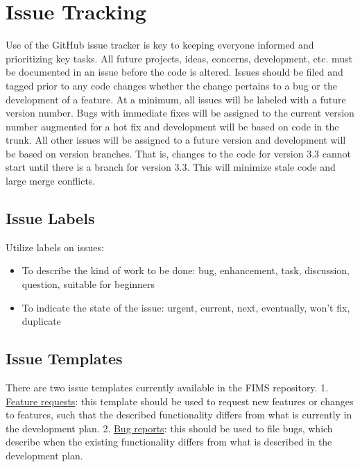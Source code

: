 \documentclass[
]{book}
\providecommand{\tightlist}{%
  \setlength{\itemsep}{0pt}\setlength{\parskip}{0pt}}
\begin{document}
\hypertarget{issue-tracking}{%
\chapter{Issue Tracking}\label{issue-tracking}}

Use of the GitHub issue tracker is key to keeping everyone informed and prioritizing key tasks. All future projects, ideas, concerns, development,
etc. must be documented in an issue before the code is altered. Issues should be filed and tagged prior to any code changes whether the change
pertains to a bug or the development of a feature. At a minimum, all issues will be labeled with a future version number. Bugs with immediate fixes will
be assigned to the current version number augmented for a hot fix and development will be based on code in the trunk. All other issues will be
assigned to a future version and development will be based on version branches. That is, changes to the code for version 3.3 cannot start until there is a branch
for version 3.3. This will minimize stale code and large merge conflicts.

\hypertarget{issue-labels}{%
\section{Issue Labels}\label{issue-labels}}

Utilize labels on issues:

\begin{itemize}
\tightlist
\item
  To describe the kind of work to be done: bug, enhancement, task, discussion, question, suitable for beginners
\item
  To indicate the state of the issue: urgent, current, next, eventually, won't fix, duplicate
\end{itemize}

\hypertarget{issue-templates}{%
\section{Issue Templates}\label{issue-templates}}

There are two issue templates currently available in the FIMS repository.
1. \href{https://github.com/NOAA-FIMS/FIMS/blob/main/.github/ISSUE_TEMPLATE/feature_request.md}{Feature requests}: this template should be used to request new features or changes to features, such that the described functionality differs from what is currently in the development plan.
2. \href{https://github.com/NOAA-FIMS/FIMS/blob/main/.github/ISSUE_TEMPLATE/bug_report.md}{Bug reports}: this should be used to file bugs, which describe when the existing functionality differs from what is described in the development plan.
\end{document}
